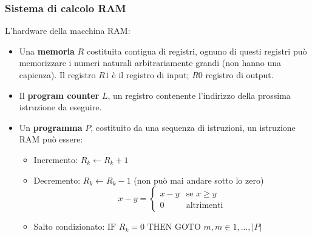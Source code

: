 \documentclass{article}
\begin{document}
\subsubsection{Sistema di calcolo RAM}
L'hardware della macchina RAM:
\begin{itemize}
    \item Una \textbf{memoria} $R$ costituita contigua di registri, ognuno di questi registri può memorizzare
          i numeri naturali arbitrariamente grandi (non hanno una capienza).
          Il registro $R1$ è il registro di input; $R0$ registro di output.

    \item Il \textbf{program counter} $L$, un registro contenente l'indirizzo della prossima
          istruzione da eseguire.

    \item Un \textbf{programma} $P$, costituito da una  sequenza di istruzioni, un istruzione RAM può essere:
          \begin{itemize}
              \item Incremento: $R_k \leftarrow R_k +1$
              \item Decremento: $R_k \leftarrow R_k -1$ (non può mai andare sotto lo zero)
                    \[
                        x-y=
                        \begin{cases}
                            x-y & \text{se } x\geq y \\
                            0   & \text{altrimenti}
                        \end{cases}
                    \]
              \item Salto condizionato: $\text{IF } R_k=0\text{ THEN GOTO } m, m\in{1,...,|P|}$
          \end{itemize}
\end{itemize}
\end{document}
